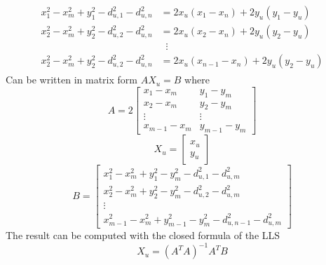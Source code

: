 \documentclass[12pt,twoside]{report}
\begin{document}
\begin{align}
\begin{split} 
x_1^2-x_m^2+y_1^2-d_{u,1}^2-d_{u,n}^2&=2x_u(x_1-x_n)+2y_u(y_1-y_u)\\ 
x_2^2-x_m^2+y_2^2-d_{u,2}^2-d_{u,n}^2&=2x_u(x_2-x_n)+2y_u(y_2-y_u)\\
&\;\;\vdots\\
x_2^2-x_m^2+y_2^2-d_{u,2}^2-d_{u,n}^2&=2x_u(x_{n-1}-x_n)+2y_u(y_2-y_u)
\end{split}
\end{align}
Can be written in matrix form $AX_u=B$
where 
\begin{equation}
    A=2\begin{bmatrix}
    x_1-x_m & y_1-y_m\\
    x_2-x_m & y_2-y_m\\
    \vdots & \vdots\\
    x_{m-1}-x_m & y_{m-1}-y_m
    \end{bmatrix}
\end{equation}
\begin{equation}
    X_u=\begin{bmatrix}
    x_u\\
    y_u
    \end{bmatrix}
\end{equation}
\begin{equation}
    B=\begin{bmatrix}
        x_{1}^2-x_m^2+y_{1}^2-y_m^2-d_{u,1}^2-d^2_{u,m}\\
        x_{2}^2-x_m^2+y_{2}^2-y_m^2-d_{u,2}^2-d^2_{u,m}\\
        \vdots\\
        x_{m-1}^2-x_m^2+y_{m-1}^2-y_m^2-d_{u,n-1}^2-d^2_{u,m}
    \end{bmatrix}
\end{equation}
The result can be computed with the closed formula of the LLS
\begin{equation}
    X_u=(A^TA)^{-1}A^TB
\end{equation}
\clearpage
\end{document}
